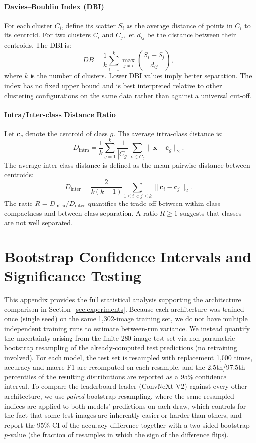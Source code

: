 \paragraph{Davies–Bouldin Index (DBI)}
For each cluster \(C_i\), define its scatter \(S_i\) as the average distance of points in \(C_i\) to its centroid. For two clusters \(C_i\) and \(C_j\), let \(d_{ij}\) be the distance between their centroids. The DBI is:
\[
DB = \frac{1}{k} \sum_{i=1}^{k} \max_{j \neq i} \left( \frac{S_i + S_j}{d_{ij}} \right),
\]
where \(k\) is the number of clusters. Lower DBI values imply better separation. The index has no fixed upper bound and is best interpreted relative to other clustering configurations on the same data rather than against a universal cut-off.

\paragraph{Intra/Inter-class Distance Ratio}
Let \(\mathbf{c}_g\) denote the centroid of class \(g\). The average intra-class distance is:
\[
D_{\text{intra}} = \frac{1}{k} \sum_{g=1}^{k} \frac{1}{|C_g|} \sum_{\mathbf{x} \in C_g} \|\mathbf{x} - \mathbf{c}_g\|_2.
\]
The average inter-class distance is defined as the mean pairwise distance between centroids:
\[
D_{\text{inter}} = \frac{2}{k(k-1)} \sum_{1 \le i < j \le k} \|\mathbf{c}_i - \mathbf{c}_j\|_2.
\]
The ratio \(R = D_{\text{intra}} / D_{\text{inter}}\) quantifies the trade-off between within-class compactness and between-class separation. A ratio \(R \ge 1\) suggests that classes are not well separated.


\section{Bootstrap Confidence Intervals and Significance Testing}
\label{app:bootstrap}

This appendix provides the full statistical analysis supporting the architecture comparison in Section~\ref{sec:experiments}. Because each architecture was trained once (single seed) on the same 1,302-image training set, we do not have multiple independent training runs to estimate between-run variance. We instead quantify the uncertainty arising from the finite 280-image test set via non-parametric bootstrap resampling of the already-computed test predictions (no retraining involved). For each model, the test set is resampled with replacement 1,000 times, accuracy and macro F1 are recomputed on each resample, and the 2.5th/97.5th percentiles of the resulting distributions are reported as a 95\% confidence interval. To compare the leaderboard leader (ConvNeXt-V2) against every other architecture, we use \emph{paired} bootstrap resampling, where the same resampled indices are applied to both models' predictions on each draw, which controls for the fact that some test images are inherently easier or harder than others, and report the 95\% CI of the accuracy difference together with a two-sided bootstrap $p$-value (the fraction of resamples in which the sign of the difference flips).

